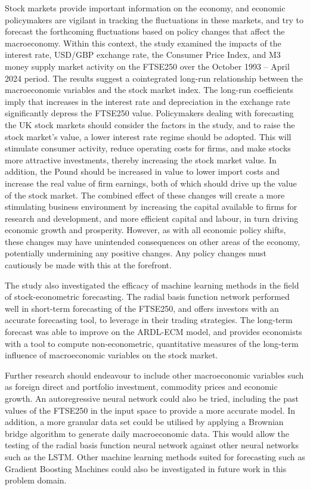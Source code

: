 \documentclass[11pt,a4paper]{article}
\begin{document}
Stock markets provide important information on the economy, 
and economic policymakers are vigilant in tracking the fluctuations 
in these markets, and try to forecast the 
forthcoming fluctuations based on policy changes that affect the macroeconomy.
Within this context, the study examined the 
impacts of the interest rate, USD/GBP
exchange rate, the Consumer Price Index, and 
M3 money supply market activity on
the FTSE250 over the October 1993 – April 2024 period.
The results suggest a cointegrated long-run
relationship between the macroeconomic variables and the stock market index. 
The long-run coefficients imply that
increases in the interest rate and depreciation in the exchange rate
significantly depress the FTSE250 value. 
Policymakers dealing with forecasting the UK stock markets
should consider the factors in the study, and to raise the stock
market's value, a lower interest rate regime should be adopted. This will 
stimulate consumer activity, reduce operating costs for firms, and make 
stocks more attractive investments, thereby increasing the stock market value. 
In addition, the Pound should be increased in value to lower import costs 
and increase the real value of firm earnings, both of which should drive up 
the value of the stock market. The combined effect of these changes will 
create a more stimulating business environment by increasing the capital 
available to firms for research and development, and more efficient 
capital and labour, in turn 
driving economic growth and prosperity. However, 
as with all economic policy shifts, these changes may have 
unintended consequences on other areas of the economy, potentially 
undermining any positive changes. Any policy changes must cautiously be made 
with this at the forefront.


The study also investigated the efficacy of machine learning methods in 
the field of stock-econometric forecasting. The radial basis function network performed well in
short-term forecasting of the FTSE250, and offers investors with an accurate forecasting tool, 
to leverage in their trading strategies. The long-term forecast was able to improve on the ARDL-ECM model, and provides 
economists with a tool to compute non-econometric, quantitative measures of the 
long-term influence of macroeconomic variables on the stock market. 

Further research should endeavour to include other macroeconomic variables such as 
foreign direct and portfolio investment, commodity prices and economic growth.
An autoregressive neural network could also be tried, including the past values of the 
FTSE250 in the input space to provide a more accurate model. In addition, 
a more granular data set could be utilised by applying a 
Brownian bridge algorithm to generate daily macroeconomic data. This would allow 
the testing of the radial basis function neural network against other neural networks 
such as the LSTM. Other machine learning methods suited for 
forecasting such as Gradient Boosting Machines could 
also be investigated in future work in this problem domain. 
\end{document}
